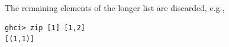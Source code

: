 The remaining elements of the longer list are discarded, e.g., 
\begin{lstlisting}
ghci> zip [1] [1,2]
[(1,1)]
\end{lstlisting}
